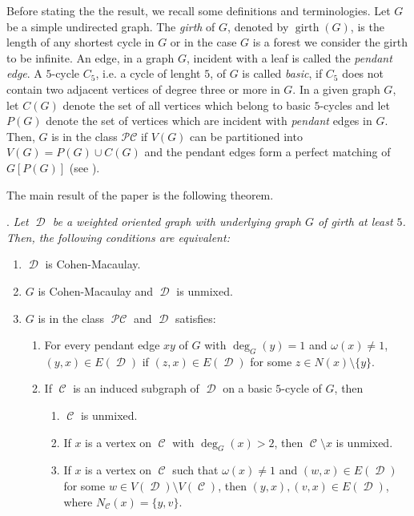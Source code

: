 \documentclass[12pt, amscd]{amsart}
\theoremstyle{definition}
\DeclareMathOperator{\girth}{girth}
\DeclareMathOperator{\pc}{\mathcal{PC}}
\DeclareMathOperator{\D}{\mathcal{D}}
\DeclareMathOperator{\C}{\mathcal{C}}
\newcommand{\0}{\bold{0}}
\begin{document}
Before stating the the result, we recall some definitions and terminologies. Let $G$ be a simple undirected graph. The {\it girth} of $G$, denoted by $\girth (G)$, is the length of any shortest cycle in $G$ or in the case $G$ is a forest we consider the girth to be infinite. An edge, in a graph $G$, incident with a leaf is called the {\it pendant edge}. A $5$-cycle $C_5$, i.e. a cycle of lenght $5$, of  $G$ is called {\it basic}, if $C_5$ does not contain two adjacent vertices of degree three or more in $G$.  In a given graph $G$, let $C(G)$ denote the set of all vertices which belong to basic $5$-cycles and let $P(G)$ denote the set of vertices  which are incident with {\it pendant} edges in $G$. Then, $G$ is in the class $\mathcal{PC}$ if $V(G)$ can be partitioned into $V(G)=P(G) \cup C(G)$ and the pendant edges form a perfect matching of $G[P(G)]$ (see \cite{FHN}).  

\medskip

The main result of the paper is the following theorem.

\medskip

{.  \it Let $\D$ be a weighted oriented graph with underlying graph $G$ of girth at least $5$. Then, the following conditions are equivalent:
\begin{enumerate}
\item $\D$ is Cohen-Macaulay.
\item $G$ is Cohen-Macaulay and $\D$ is unmixed.
\item $G$ is in the class $\pc$ and $\D$ satisfies:
\begin{enumerate}
\item For every pendant edge $xy$ of $G$ with $\deg_G(y)=1$ and $\omega(x) \ne 1$, $(y,x)\in E(\D)$ if $(z,x)\in E(\D)$ for some $z\in N(x)\setminus \{y\}$.
\item If $\C$ is an induced subgraph of $\D$ on a basic $5$-cycle of $G$, then
\begin{enumerate}
\item $\C$ is unmixed.
\item If $x$ is a vertex on $\C$ with $\deg_G(x) > 2$, then $\C\setminus x$ is unmixed.
\item If $x$ is a vertex on $\C$ such that $\omega(x)\ne 1$ and $(w,x)\in E(\D)$ for some $w\in V(\D)\setminus V(\C)$, then $(y,x), (v,x)\in E(\D)$, where $N_{\C}(x)=\{y,v\}$.
\end{enumerate}
\end{enumerate}
\end{enumerate}
}
\end{document}
